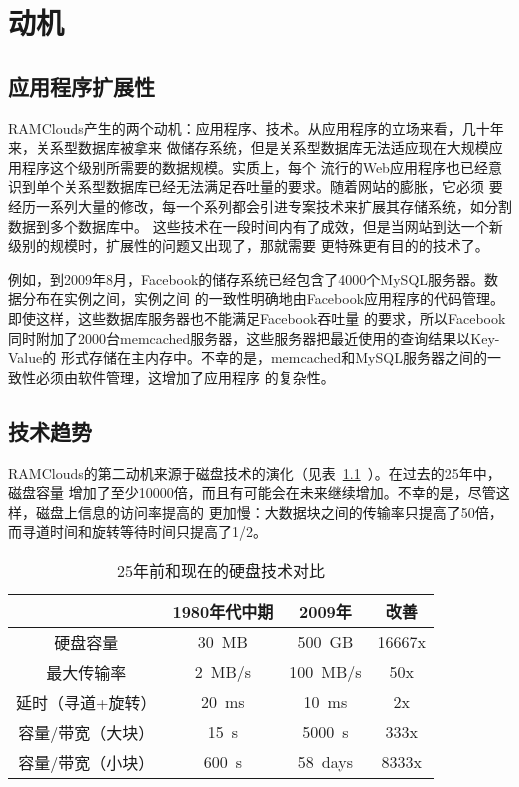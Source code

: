 \documentclass[translation]{zjutreport}
\begin{document}
\chapter{动机}
\section{应用程序扩展性}
RAMClouds产生的两个动机：应用程序、技术。从应用程序的立场来看，几十年来，关系型数据库被拿来
做储存系统，但是关系型数据库无法适应现在大规模应用程序这个级别所需要的数据规模。实质上，每个
流行的Web应用程序也已经意识到单个关系型数据库已经无法满足吞吐量的要求。随着网站的膨胀，它必须
要经历一系列大量的修改，每一个系列都会引进专案技术来扩展其存储系统，如分割数据到多个数据库中。
这些技术在一段时间内有了成效，但是当网站到达一个新级别的规模时，扩展性的问题又出现了，那就需要
更特殊更有目的的技术了。

例如，到2009年8月，Facebook的储存系统已经包含了4000个MySQL服务器。数据分布在实例之间，实例之间
的一致性明确地由Facebook应用程序的代码管理。即使这样，这些数据库服务器也不能满足Facebook吞吐量
的要求，所以Facebook同时附加了2000台memcached服务器，这些服务器把最近使用的查询结果以Key-Value的
形式存储在主内存中。不幸的是，memcached和MySQL服务器之间的一致性必须由软件管理，这增加了应用程序
的复杂性。

\section{技术趋势}
RAMClouds的第二动机来源于磁盘技术的演化（见表~\ref{tab:table2}~）。在过去的25年中，磁盘容量
增加了至少10000倍，而且有可能会在未来继续增加。不幸的是，尽管这样，磁盘上信息的访问率提高的
更加慢：大数据块之间的传输率只提高了50倍，而寻道时间和旋转等待时间只提高了1/2。

\begin{table}[htbp]
\caption{25年前和现在的硬盘技术对比}\label{tab:table2}
\vspace{0.5em}
\begin{center}
{\wuhao
\begin{tabular}{cccc}
\toprule[1.5pt]
 & 1980年代中期 & 2009年 & 改善\\
\midrule[1pt]
硬盘容量 & 30~MB & 500~GB & 16667x\\
最大传输率 & 2~MB/s & 100~MB/s & 50x \\
延时（寻道+旋转）& 20~ms & 10~ms & 2x \\
容量/带宽（大块） & 15~s & 5000~s & 333x \\
容量/带宽（小块） & 600~s & 58~days & 8333x \\
\bottomrule[1.5pt]
\end{tabular}}
\end{center}
\vspace{\baselineskip}
\end{table}
\end{document}
